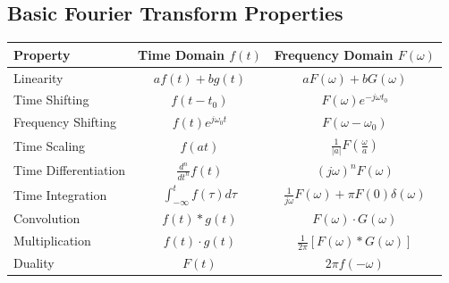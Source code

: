 \documentclass{article}
\begin{document}
\subsection*{Basic Fourier Transform Properties}
\begin{center}
\begin{tabular}{|l|c|c|}
\hline
\textbf{Property} & \textbf{Time Domain} $f(t)$ & \textbf{Frequency Domain} $F(\omega)$ \\ \hline
Linearity & $a f(t) + b g(t)$ & $a F(\omega) + b G(\omega)$ \\ \hline
Time Shifting & $f(t - t_0)$ & $F(\omega) e^{-j\omega t_0}$ \\ \hline
Frequency Shifting & $f(t) e^{j\omega_0 t}$ & $F(\omega - \omega_0)$ \\ \hline
Time Scaling & $f(at)$ & $\frac{1}{|a|} F\left(\frac{\omega}{a}\right)$ \\ \hline
Time Differentiation & $\frac{d^n}{dt^n} f(t)$ & $(j\omega)^n F(\omega)$ \\ \hline
Time Integration & $\int_{-\infty}^{t} f(\tau) d\tau$ & $\frac{1}{j\omega}F(\omega) + \pi F(0)\delta(\omega)$ \\ \hline
Convolution & $f(t) * g(t)$ & $F(\omega) \cdot G(\omega)$ \\ \hline
Multiplication & $f(t) \cdot g(t)$ & $\frac{1}{2\pi} [F(\omega) * G(\omega)]$ \\ \hline
Duality & $F(t)$ & $2\pi f(-\omega)$ \\ \hline
\end{tabular}
\end{center}
\end{document}
